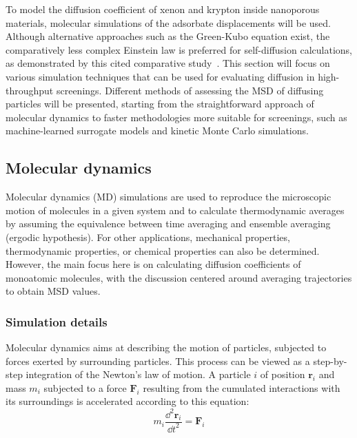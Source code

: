 \documentclass[main]{subfiles}
\begin{document}
To model the diffusion coefficient of xenon and krypton inside nanoporous materials, molecular simulations of the adsorbate displacements will be used. Although alternative approaches such as the Green-Kubo equation exist, the comparatively less complex Einstein law is preferred for self-diffusion calculations, as demonstrated by this cited comparative study~\cite{Maginn_2020}. This section will focus on various simulation techniques that can be used for evaluating diffusion in high-throughput screenings. Different methods of assessing the MSD of diffusing particles will be presented, starting from the straightforward approach of molecular dynamics to faster methodologies more suitable for screenings, such as machine-learned surrogate models and kinetic Monte Carlo simulations.

\subsection{Molecular dynamics}

Molecular dynamics (MD) simulations are used to reproduce the microscopic motion of molecules in a given system and to calculate thermodynamic averages by assuming the equivalence between time averaging and ensemble averaging (ergodic hypothesis). For other applications, mechanical properties, thermodynamic properties, or chemical properties can also be determined. However, the main focus here is on calculating diffusion coefficients of monoatomic molecules, with the discussion centered around averaging trajectories to obtain MSD values.

\subsubsection{Simulation details}

Molecular dynamics aims at describing the motion of particles, subjected to forces exerted by surrounding particles. This process can be viewed as a step-by-step integration of the Newton's law of motion. A particle $i$ of position $\mathbf{r}_i$ and mass $m_i$ subjected to a force $\mathbf{F}_i$ resulting from the cumulated interactions with its surroundings is accelerated according to this equation:
\begin{equation}\label{eq:newton}
  m_i\frac{\dd^2 \mathbf{r}_i}{{\dd t}^2} = \mathbf{F}_i
\end{equation}
\end{document}
